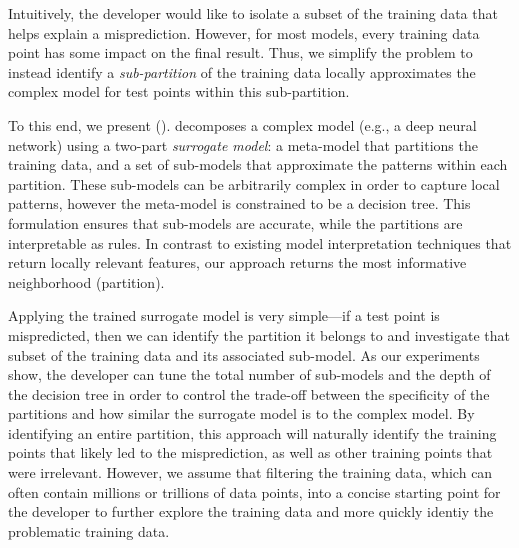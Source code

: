 

Intuitively, the developer would like to isolate a subset of the training data that helps explain a misprediction. 
However, for most models, every training data point has some impact on the final result.
Thus, we simplify the problem to instead identify a {\it sub-partition} of the training data locally approximates the complex model for test points within this sub-partition.  

To this end, we present \sysfull (\sys).   \sys decomposes a complex model (e.g., a deep neural network) using a two-part {\it surrogate model}: a meta-model that partitions the training data, and a set of sub-models that approximate the patterns within each partition.
These sub-models can be arbitrarily complex in order to capture local patterns, however the meta-model is constrained to be a decision tree.
This formulation ensures that sub-models are accurate, while the partitions are interpretable as rules.
In contrast to existing model interpretation techniques that return locally relevant features, our approach returns the most informative neighborhood (partition).

Applying the trained surrogate model is very simple---if a test point is mispredicted, then we can identify the partition it belongs to and investigate that subset of the training data and its associated sub-model.
As our experiments show, the developer can tune the total number of sub-models and the depth of the decision tree in order to control the trade-off between the specificity of the partitions and how similar the surrogate model is to the complex model.
By identifying an entire partition, this approach will naturally identify the training points that likely led to the misprediction, as well as other training points that were irrelevant.   However, we assume that filtering the training data, which can often contain millions or trillions of data points, into a concise starting point for the developer to further explore the training data and more quickly identiy the problematic training data.

